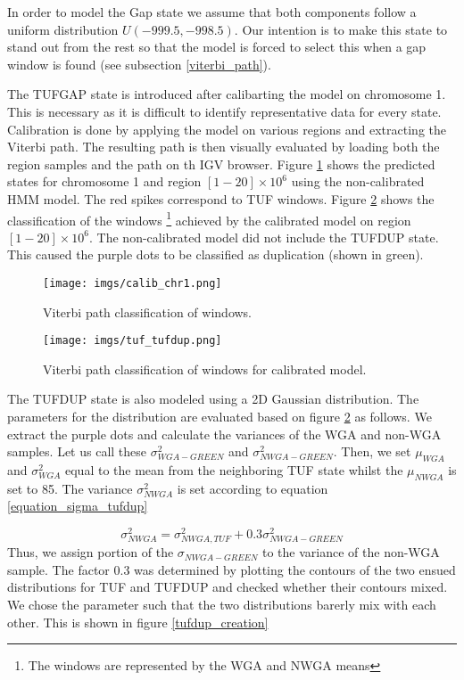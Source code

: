 In order to model the Gap state we assume that both components follow a uniform distribution $U(-999.5, -998.5)$. Our intention is to make this state to stand out from the rest so that the model is forced to  select this when a gap window is found (see subsection \ref{viterbi_path}).
 
The TUFGAP state is introduced after calibarting the model on chromosome 1.   
This is necessary as it is difficult to identify representative data for every state. Calibration is done by applying 
the model on various regions and extracting the Viterbi path. The resulting path is then visually evaluated by loading both the region samples and the path on th IGV browser.  Figure \ref{calib_chr1} shows the predicted states for chromosome 1 and region $[1-20]\times 10^6$ using the non-calibrated HMM model. The red spikes correspond to TUF windows. Figure \ref{tuf_tufdup} shows the classification of the windows \footnote{The windows are represented by the WGA and NWGA means} achieved by the calibrated model on region $[1-20]\times 10^6$. The non-calibrated model did not include the TUFDUP state. This caused the purple dots to be classified as duplication (shown in green). 

\begin{figure}[!htb]
	\begin{center}
		\texttt{[image: imgs/calib\_chr1.png]}
	\end{center}
	\caption{Viterbi path classification of windows.}
	\label{calib_chr1}
\end{figure}

\begin{figure}[!htb]
	\begin{center}
		\texttt{[image: imgs/tuf\_tufdup.png]}
	\end{center}
	\caption{Viterbi path classification of windows for calibrated model.}
	\label{tuf_tufdup}
\end{figure}
The TUFDUP state is also modeled using a 2D Gaussian distribution. The parameters for the distribution are evaluated based on  figure \ref{tuf_tufdup} as follows.
We extract the purple dots and calculate the variances of the WGA and non-WGA samples. Let us  call these $\sigma_{WGA-GREEN}^2$ and $\sigma_{NWGA-GREEN}^2$.  Then, we set $\mu_{WGA}$ and $\sigma_{WGA}^2$ equal to the mean from the neighboring TUF state whilst the $\mu_{NWGA}$ is set to 85.  The variance $\sigma_{NWGA}^2$  is set according to equation \ref{equation_sigma_tufdup}

\begin{equation}
	\sigma_{NWGA}^2 = \sigma_{NWGA, TUF}^2 + 0.3 \sigma_{NWGA-GREEN}^2
	\label{equation_sigma_tufdup}
\end{equation} 
Thus, we assign portion of the $\sigma_{NWGA-GREEN}$ to the variance of the non-WGA sample. The factor 0.3 was determined by plotting the contours of the two ensued distributions for TUF and TUFDUP and checked whether their contours mixed. We chose the parameter such that the two distributions barerly mix with each other. This is shown in figure \ref{tufdup_creation}


